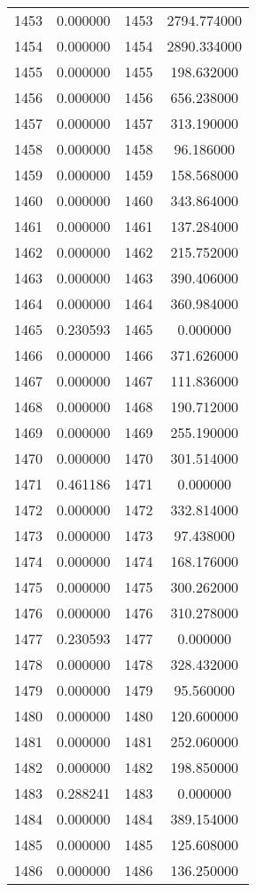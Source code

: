 \documentclass[12pt]{article}
\begin{document}
\begin{longtable}{@{}cccc@{}}
1453 & 0.000000 & 1453 & 2794.774000 \\
1454 & 0.000000 & 1454 & 2890.334000 \\
1455 & 0.000000 & 1455 & 198.632000 \\
1456 & 0.000000 & 1456 & 656.238000 \\
1457 & 0.000000 & 1457 & 313.190000 \\
1458 & 0.000000 & 1458 & 96.186000 \\
1459 & 0.000000 & 1459 & 158.568000 \\
1460 & 0.000000 & 1460 & 343.864000 \\
1461 & 0.000000 & 1461 & 137.284000 \\
1462 & 0.000000 & 1462 & 215.752000 \\
1463 & 0.000000 & 1463 & 390.406000 \\
1464 & 0.000000 & 1464 & 360.984000 \\
1465 & 0.230593 & 1465 & 0.000000 \\
1466 & 0.000000 & 1466 & 371.626000 \\
1467 & 0.000000 & 1467 & 111.836000 \\
1468 & 0.000000 & 1468 & 190.712000 \\
1469 & 0.000000 & 1469 & 255.190000 \\
1470 & 0.000000 & 1470 & 301.514000 \\
1471 & 0.461186 & 1471 & 0.000000 \\
1472 & 0.000000 & 1472 & 332.814000 \\
1473 & 0.000000 & 1473 & 97.438000 \\
1474 & 0.000000 & 1474 & 168.176000 \\
1475 & 0.000000 & 1475 & 300.262000 \\
1476 & 0.000000 & 1476 & 310.278000 \\
1477 & 0.230593 & 1477 & 0.000000 \\
1478 & 0.000000 & 1478 & 328.432000 \\
1479 & 0.000000 & 1479 & 95.560000 \\
1480 & 0.000000 & 1480 & 120.600000 \\
1481 & 0.000000 & 1481 & 252.060000 \\
1482 & 0.000000 & 1482 & 198.850000 \\
1483 & 0.288241 & 1483 & 0.000000 \\
1484 & 0.000000 & 1484 & 389.154000 \\
1485 & 0.000000 & 1485 & 125.608000 \\
1486 & 0.000000 & 1486 & 136.250000 \\

\end{longtable}
\end{document}
